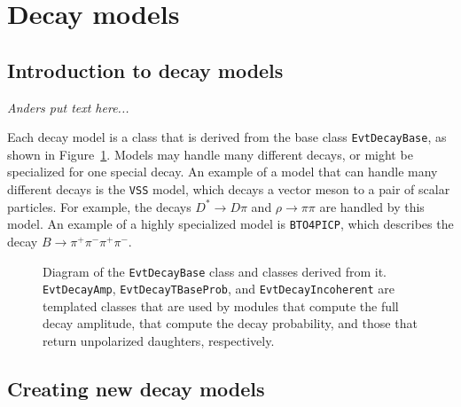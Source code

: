 \section{Decay models}
\label{sect:newmodel}

\subsection{Introduction to decay models}

{\it Anders put text here...}

Each decay model is a class that is derived from the
base class {\tt EvtDecayBase}, as shown in Figure~\ref{fig:decaybase}. 
Models may handle many different
decays, or might be specialized for one special decay. 
An example of a model that can handle many different decays
is the {\tt VSS} model, which decays a vector meson
to a pair of scalar particles. For example, the decays
$D^*\rightarrow D\pi$ and 
$\rho\rightarrow \pi\pi$ are handled by this model. 
An example of a highly specialized model is
{\tt BTO4PICP}, which describes
the decay $B\rightarrow \pi^+\pi^-\pi^+\pi^-$.

\begin{figure}
\begin{center}
\caption{Diagram of the {\tt EvtDecayBase} class and
classes derived from it.  {\tt EvtDecayAmp},
{\tt EvtDecayTBaseProb}, and {\tt EvtDecayIncoherent} are
templated classes that are used by modules that compute
the full decay amplitude, that compute the decay probability, 
and those that return unpolarized daughters, respectively.}
\label{fig:decaybase}
\end{center}
\end{figure}

\subsection{Creating new decay models}

